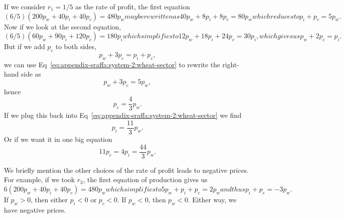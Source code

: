 \begin{example}
  If we consider $r_{1}=1/5$ as the rate of profit, the first equation
\begin{subequations}
  \begin{equation}
(6/5)(200p_{w} + 40 p_{i} + 40 p_{c}) = 480p_{w}
  \end{equation}
  may be rewritten as
  \begin{equation}
40p_{w} + 8p_{i} + 8p_{c} = 80p_{w}
  \end{equation}
  which reduces to
  \begin{equation}\label{eq:appendix-sraffa:system-2:wheat-sector}
p_{i} + p_{c} = 5p_{w}.
  \end{equation}
\end{subequations}
Now if we look at the second equation,
\begin{subequations}
  \begin{equation}
(6/5)(60p_{w} + 90 p_{i} + 120 p_{c}) = 180p_{i}
  \end{equation}
  which simplifies to
  \begin{equation}
12p_{w} + 18p_{i} + 24p_{c} = 30p_{i},
  \end{equation}
  which gives us
  \begin{equation}
p_{w} + 2p_{c} = p_{i}.
  \end{equation}
\end{subequations}
But if we add $p_{c}$ to both sides,
\begin{equation}
p_{w} + 3p_{c} = p_{i} + p_{c},
\end{equation}
we can use Eq~\eqref{eq:appendix-sraffa:system-2:wheat-sector} to
rewrite the right-hand side as
\begin{equation}
p_{w} + 3p_{c} = 5p_{w},
\end{equation}
hence
\begin{equation}
\boxed{p_{c} = \frac{4}{3}p_{w}.}
\end{equation}
If we plug this back into Eq~\eqref{eq:appendix-sraffa:system-2:wheat-sector}
we find
\begin{equation}
\boxed{p_{i} = \frac{11}{3}p_{w}.}
\end{equation}
Or if we want it in one big equation
\begin{equation}
\boxed{11p_{c} = 4p_{i} = \frac{44}{3}p_{w}.}
\end{equation}

We briefly mention the other choices of the rate of profit leads to
negative prices. For example, if we took $r_{3}$, the first equation of
production gives us
\begin{subequations}
\begin{equation}
6(200p_{w} + 40p_{i} + 40p_{c}) = 480p_{w}
\end{equation}
which simplifies to
\begin{equation}
5p_{w} + p_{i} + p_{c} = 2p_{w}
\end{equation}
and thus
\begin{equation}
p_{i} + p_{c} = -3p_{w}.
\end{equation}
\end{subequations}
If $p_{w}>0$, then either $p_{i}<0$ or $p_{c}<0$. If $p_{w}<0$, then $p_{w}<0$.
Either way, we have negative prices.


\end{example}
